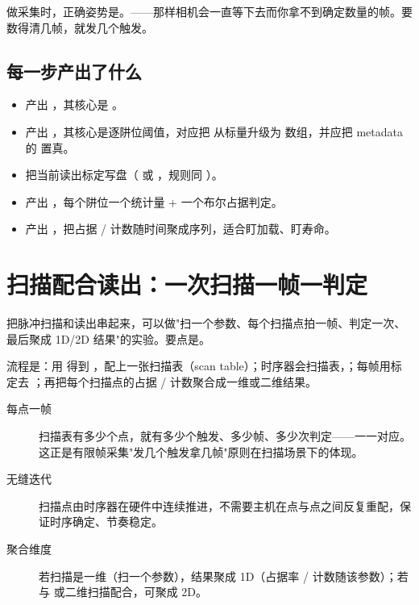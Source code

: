 \documentclass[11pt,oneside,openany]{book}
\begin{document}
\begin{notebox}
做采集时，正确姿势是。——那样相机会一直等下去而你拿不到确定数量的帧。要数得清几帧，就发几个触发。
\end{notebox}

\subsection{每一步产出了什么}

\begin{itemize}
\item {} 产出 ，其核心是 。
\item {} 产出 ，其核心是逐阱位阈值，对应把  从标量升级为  数组，并应把 metadata 的  置真。
\item {} 把当前读出标定写盘（ 或 ，规则同 ）。
\item {} 产出 ，每个阱位一个统计量 + 一个布尔占据判定。
\item {} 产出 ，把占据 / 计数随时间聚成序列，适合盯加载、盯寿命。
\end{itemize}

\section{扫描配合读出：一次扫描一帧一判定}

把脉冲扫描和读出串起来，可以做"扫一个参数、每个扫描点拍一帧、判定一次、最后聚成 1D/2D 结果"的实验。要点是。

流程是：用  得到 ，配上一张扫描表（scan table）；时序器会扫描表，；每帧用标定去 ；再把每个扫描点的占据 / 计数聚合成一维或二维结果。

\begin{description}
\item[每点一帧] 扫描表有多少个点，就有多少个触发、多少帧、多少次判定——一一对应。这正是有限帧采集"发几个触发拿几帧"原则在扫描场景下的体现。
\item[无缝迭代] 扫描点由时序器在硬件中连续推进，不需要主机在点与点之间反复重配，保证时序确定、节奏稳定。
\item[聚合维度] 若扫描是一维（扫一个参数），结果聚成 1D（占据率 / 计数随该参数）；若与  或二维扫描配合，可聚成 2D。
\end{description}
\end{document}
